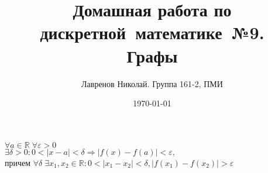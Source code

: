 \documentclass[12pt, tikz]{article}
\title{Домашная работа по дискретной~математике~№9.\\Графы}
\date{\today}
\author{Лавренов Николай. Группа 161-2, ПМИ}
\begin{document}
 $\forall a \in \mathbb{R} \; \forall \varepsilon > 0 \;$ \\
 $ \exists \delta > 0:  0 < |x - a| < \delta \Rightarrow |f(x) - f(a)| < \varepsilon, $\\причем
 $ \forall \delta \; \exists x_1, x_2 \in \mathbb{R}: 0 < |x_1-x_2| < \delta, |f(x_1)-f(x_2)| > \varepsilon$
	
\end{document}

